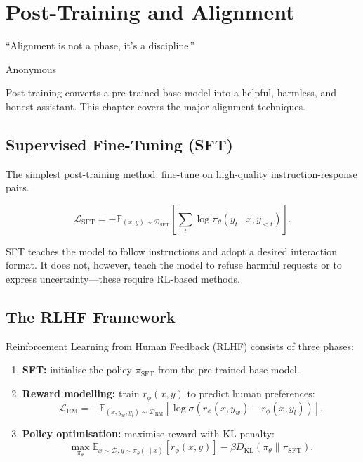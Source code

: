 \documentclass[11pt,a4paper]{book}
\theoremstyle{definition}
\begin{document}
\chapter{Post-Training and Alignment}
\label{ch:alignment}

\epigraph{``Alignment is not a phase, it's a discipline.''}{Anonymous}

Post-training converts a pre-trained base model into a helpful, harmless, and honest assistant. This chapter covers the major alignment techniques.

\section{Supervised Fine-Tuning (SFT)}

The simplest post-training method: fine-tune on high-quality instruction-response pairs.

\begin{equation}
	\mathcal{L}_{\text{SFT}} = -\mathbb{E}_{(x,y) \sim \mathcal{D}_{\text{SFT}}}\left[\sum_{t} \log \pi_\theta(y_t \mid x, y_{<t})\right].
\end{equation}

SFT teaches the model to follow instructions and adopt a desired interaction format. It does not, however, teach the model to refuse harmful requests or to express uncertainty---these require RL-based methods.

\section{The RLHF Framework}

Reinforcement Learning from Human Feedback (RLHF) consists of three phases:

\begin{enumerate}
	\item \textbf{SFT:} initialise the policy $\pi_{\text{SFT}}$ from the pre-trained base model.
	\item \textbf{Reward modelling:} train $r_\phi(x, y)$ to predict human preferences:
	      \begin{equation}
		      \mathcal{L}_{\text{RM}} = -\mathbb{E}_{(x, y_w, y_l) \sim \mathcal{D}_{\text{RM}}}\left[\log \sigma(r_\phi(x, y_w) - r_\phi(x, y_l))\right].
	      \end{equation}
	\item \textbf{Policy optimisation:} maximise reward with KL penalty:
	      \begin{equation}
		      \max_{\pi_\theta} \mathbb{E}_{x \sim \mathcal{D}, y \sim \pi_\theta(\cdot \mid x)}\left[r_\phi(x, y)\right] - \beta D_{\mathrm{KL}}(\pi_\theta \parallel \pi_{\text{SFT}}).
	      \end{equation}
\end{enumerate}
\end{document}
